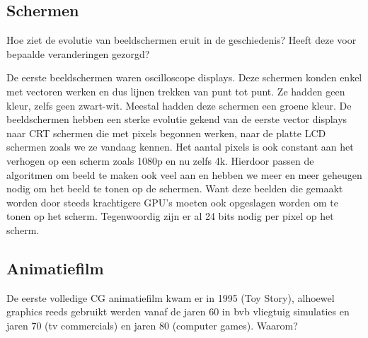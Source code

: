\documentclass[../main.tex]{subfiles}
\begin{document}
\subsection{Schermen}
\begin{question}
	Hoe ziet de evolutie van beeldschermen eruit in de geschiedenis? Heeft deze voor bepaalde veranderingen gezorgd?
\end{question}

\begin{solution}
	De eerste beeldschermen waren oscilloscope displays. Deze schermen konden enkel met vectoren werken en dus lijnen trekken van punt tot punt. Ze hadden geen kleur, zelfs geen zwart-wit. Meestal hadden deze schermen een groene kleur.
	De beeldschermen hebben een sterke evolutie gekend van de eerste vector displays naar CRT schermen die met pixels begonnen werken, naar de platte LCD schermen zoals we ze vandaag kennen. Het aantal pixels is ook constant aan het verhogen op een scherm zoals 1080p en nu zelfs 4k. Hierdoor passen de algoritmen om beeld te maken ook veel aan en hebben we meer en meer geheugen nodig om het beeld te tonen op de schermen. Want deze beelden die gemaakt worden door steeds krachtigere GPU's moeten ook opgeslagen worden om te tonen op het scherm.
	Tegenwoordig zijn er al 24 bits nodig per pixel op het scherm.
\end{solution}

\subsection{Animatiefilm}

\begin{question}
	De eerste volledige CG animatiefilm kwam er in 1995 (Toy Story), alhoewel graphics reeds gebruikt werden vanaf de jaren 60 in bvb vliegtuig simulaties en jaren 70 (tv commercials) en jaren 80 (computer games). Waarom?
\end{question}
\end{document}
